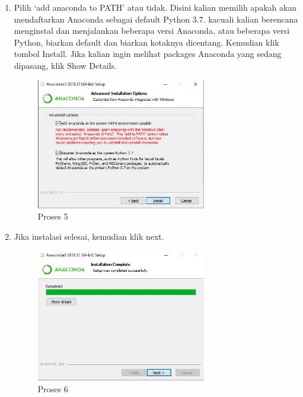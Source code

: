 \begin{itemize}
\begin{enumerate}
\item Pilih ‘add anaconda to PATH’ atau tidak. Disini kalian memilih apakah akan mendaftarkan Anaconda sebagai default Python 3.7. kacuali kalian berencana menginstal dan menjalankan beberapa versi Anaconda, atau beberapa versi Python, biarkan default dan biarkan kotaknya dicentang. Kemudian klik tombol Install. Jika kalian ingin melihat packages Anaconda yang sedang dipasang, klik Show Details.
\begin{figure}[ht]
	\centerline{\includegraphics[width=0.70\textwidth]{figures/Rahma/e.JPG}}
	\caption{Proses 5 }
	\label{gambar5 }
\end{figure}

\item Jika instalasi selesai, kemudian klik next.
\begin{figure}[ht]
	\centerline{\includegraphics[width=0.70\textwidth]{figures/Rahma/f.JPG}}
	\caption{Proses 6 }
	\label{gambar6 }
\end{figure}


\end{enumerate}
\end{itemize}
